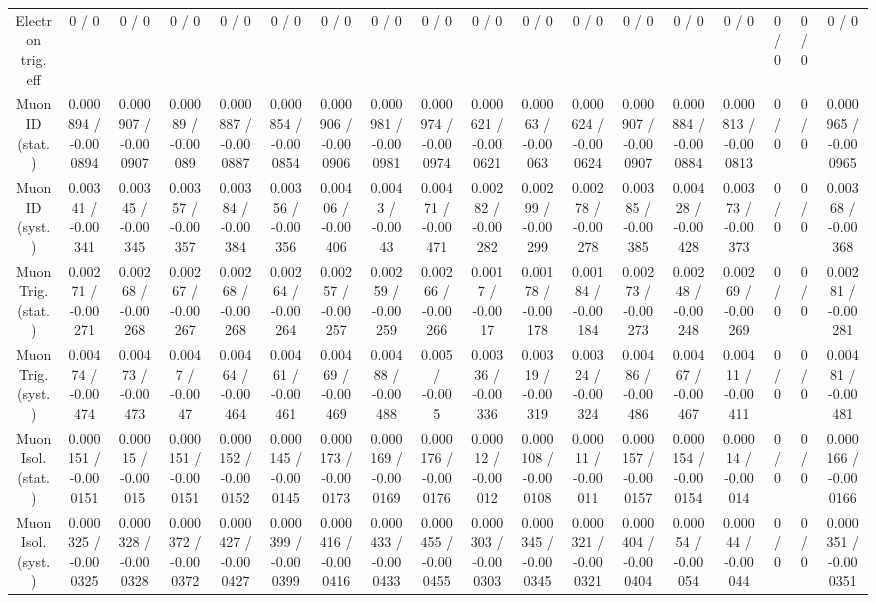 \documentclass[10pt]{article}
\begin{document}
\begin{table}[htbp]
\begin{center}
\begin{tabular}{|c|c|c|c|c|c|c|c|c|c|c|c|c|c|c|c|c|c|}
  Electron trig. eff & 0 / 0 & 0 / 0 & 0 / 0 & 0 / 0 & 0 / 0 & 0 / 0 & 0 / 0 & 0 / 0 & 0 / 0 & 0 / 0 & 0 / 0 & 0 / 0 & 0 / 0 & 0 / 0 & 0 / 0 & 0 / 0 & 0 / 0 \\ 
  Muon ID (stat.) & 0.000894 / -0.000894 & 0.000907 / -0.000907 & 0.00089 / -0.00089 & 0.000887 / -0.000887 & 0.000854 / -0.000854 & 0.000906 / -0.000906 & 0.000981 / -0.000981 & 0.000974 / -0.000974 & 0.000621 / -0.000621 & 0.00063 / -0.00063 & 0.000624 / -0.000624 & 0.000907 / -0.000907 & 0.000884 / -0.000884 & 0.000813 / -0.000813 & 0 / 0 & 0 / 0 & 0.000965 / -0.000965 \\ 
  Muon ID (syst.) & 0.00341 / -0.00341 & 0.00345 / -0.00345 & 0.00357 / -0.00357 & 0.00384 / -0.00384 & 0.00356 / -0.00356 & 0.00406 / -0.00406 & 0.0043 / -0.0043 & 0.00471 / -0.00471 & 0.00282 / -0.00282 & 0.00299 / -0.00299 & 0.00278 / -0.00278 & 0.00385 / -0.00385 & 0.00428 / -0.00428 & 0.00373 / -0.00373 & 0 / 0 & 0 / 0 & 0.00368 / -0.00368 \\ 
  Muon Trig. (stat.) & 0.00271 / -0.00271 & 0.00268 / -0.00268 & 0.00267 / -0.00267 & 0.00268 / -0.00268 & 0.00264 / -0.00264 & 0.00257 / -0.00257 & 0.00259 / -0.00259 & 0.00266 / -0.00266 & 0.0017 / -0.0017 & 0.00178 / -0.00178 & 0.00184 / -0.00184 & 0.00273 / -0.00273 & 0.00248 / -0.00248 & 0.00269 / -0.00269 & 0 / 0 & 0 / 0 & 0.00281 / -0.00281 \\ 
  Muon Trig. (syst.) & 0.00474 / -0.00474 & 0.00473 / -0.00473 & 0.0047 / -0.0047 & 0.00464 / -0.00464 & 0.00461 / -0.00461 & 0.00469 / -0.00469 & 0.00488 / -0.00488 & 0.005 / -0.005 & 0.00336 / -0.00336 & 0.00319 / -0.00319 & 0.00324 / -0.00324 & 0.00486 / -0.00486 & 0.00467 / -0.00467 & 0.00411 / -0.00411 & 0 / 0 & 0 / 0 & 0.00481 / -0.00481 \\ 
  Muon Isol. (stat.) & 0.000151 / -0.000151 & 0.00015 / -0.00015 & 0.000151 / -0.000151 & 0.000152 / -0.000152 & 0.000145 / -0.000145 & 0.000173 / -0.000173 & 0.000169 / -0.000169 & 0.000176 / -0.000176 & 0.00012 / -0.00012 & 0.000108 / -0.000108 & 0.00011 / -0.00011 & 0.000157 / -0.000157 & 0.000154 / -0.000154 & 0.00014 / -0.00014 & 0 / 0 & 0 / 0 & 0.000166 / -0.000166 \\ 
  Muon Isol. (syst.) & 0.000325 / -0.000325 & 0.000328 / -0.000328 & 0.000372 / -0.000372 & 0.000427 / -0.000427 & 0.000399 / -0.000399 & 0.000416 / -0.000416 & 0.000433 / -0.000433 & 0.000455 / -0.000455 & 0.000303 / -0.000303 & 0.000345 / -0.000345 & 0.000321 / -0.000321 & 0.000404 / -0.000404 & 0.00054 / -0.00054 & 0.00044 / -0.00044 & 0 / 0 & 0 / 0 & 0.000351 / -0.000351 \\ 

\end{tabular}
\end{center}
\end{table}
\end{document}
